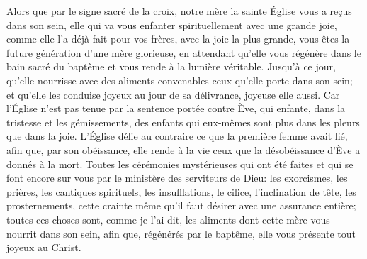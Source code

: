 Alors que par le signe sacré de la croix,
	notre mère la sainte Église vous a reçus dans son sein,
	elle qui va vous enfanter spirituellement avec une grande joie,
	comme elle l’a déjà fait pour vos frères,
	avec la joie la plus grande,
	vous êtes la future génération d’une mère glorieuse,
	en attendant qu’elle vous régénère dans le bain sacré du baptême
	et vous rende à la lumière véritable.
Jusqu’à ce jour, qu’elle nourrisse avec des aliments convenables
	ceux qu’elle porte dans son sein;
	et qu’elle les conduise joyeux au jour de sa délivrance,
	joyeuse elle aussi.
Car l’Église n’est pas tenue par la sentence portée contre Ève,
	qui enfante, dans la tristesse et les gémissements,
	des enfants qui eux-mêmes sont plus dans les pleurs que dans la joie.
L’Église délie au contraire ce que la première femme avait lié,
	afin que, par son obéissance,
	elle rende à la vie ceux que la désobéissance d’Ève a donnés à la mort.
Toutes les cérémonies mystérieuses qui ont été faites
	et qui se font encore sur vous par le ministère des serviteurs de Dieu:
	les exorcismes, les prières, les cantiques spirituels,
	les insufflations, le cilice, l’inclination de tête, les prosternements,
	cette crainte même qu’il faut désirer avec une assurance entière;
	toutes ces choses sont, comme je l’ai dit,
	les aliments dont cette mère vous nourrit dans son sein,
	afin que, régénérés par le baptême,
	elle vous présente tout joyeux au Christ.
